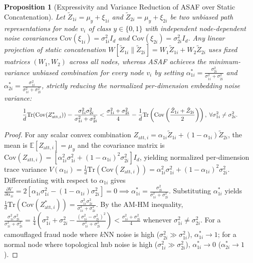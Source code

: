 \documentclass[10pt,a4paper,twocolumn]{article}
\newtheorem{proposition}{Proposition}
\begin{document}
\begin{proposition}[Expressivity and Variance Reduction of ASAF over Static Concatenation]
Let $\tilde{Z}_{1i} = \mu_y + \xi_{1i}$ and $\tilde{Z}_{2i} = \mu_y + \xi_{2i}$ be two unbiased path representations for node $v_i$ of class $y \in \{0, 1\}$ with independent node-dependent noise covariances $\text{Cov}(\xi_{1i}) = \sigma_{1i}^2 I_d$ and $\text{Cov}(\xi_{2i}) = \sigma_{2i}^2 I_d$. Any linear projection of static concatenation $W[\tilde{Z}_{1i} \parallel \tilde{Z}_{2i}] = W_1 \tilde{Z}_{1i} + W_2 \tilde{Z}_{2i}$ uses fixed matrices $(W_1, W_2)$ across all nodes, whereas ASAF achieves the minimum-variance unbiased combination for every node $v_i$ by setting $\alpha_{1i}^* = \frac{\sigma_{2i}^2}{\sigma_{1i}^2 + \sigma_{2i}^2}$ and $\alpha_{2i}^* = \frac{\sigma_{1i}^2}{\sigma_{1i}^2 + \sigma_{2i}^2}$, strictly reducing the normalized per-dimension embedding noise variance:
\begin{equation}
  \resizebox{0.89\linewidth}{!}{$\displaystyle \frac{1}{d}\text{Tr}(\text{Cov}(Z_{\text{att},i}^*)) = \frac{\sigma_{1i}^2 \sigma_{2i}^2}{\sigma_{1i}^2 + \sigma_{2i}^2} < \frac{\sigma_{1i}^2 + \sigma_{2i}^2}{4} = \frac{1}{d}\text{Tr}\left(\text{Cov}\left(\frac{\tilde{Z}_{1i} + \tilde{Z}_{2i}}{2}\right)\right), \; \forall \sigma_{1i}^2 \neq \sigma_{2i}^2.$}
\end{equation}
\end{proposition}

\begin{proof}
For any scalar convex combination $Z_{\text{att},i} = \alpha_{1i} \tilde{Z}_{1i} + (1 - \alpha_{1i}) \tilde{Z}_{2i}$, the mean is $\mathbb{E}[Z_{\text{att},i}] = \mu_y$ and the covariance matrix is $\text{Cov}(Z_{\text{att},i}) = [\alpha_{1i}^2 \sigma_{1i}^2 + (1 - \alpha_{1i})^2 \sigma_{2i}^2] I_d$, yielding normalized per-dimension trace variance $V(\alpha_{1i}) = \frac{1}{d}\text{Tr}(\text{Cov}(Z_{\text{att},i})) = \alpha_{1i}^2 \sigma_{1i}^2 + (1 - \alpha_{1i})^2 \sigma_{2i}^2$. Differentiating with respect to $\alpha_{1i}$ gives $\frac{\partial V}{\partial \alpha_{1i}} = 2[\alpha_{1i} \sigma_{1i}^2 - (1 - \alpha_{1i})\sigma_{2i}^2] = 0 \implies \alpha_{1i}^* = \frac{\sigma_{2i}^2}{\sigma_{1i}^2 + \sigma_{2i}^2}$. Substituting $\alpha_{1i}^*$ yields $\frac{1}{d}\text{Tr}(\text{Cov}(Z_{\text{att},i}^*)) = \frac{\sigma_{1i}^2 \sigma_{2i}^2}{\sigma_{1i}^2 + \sigma_{2i}^2}$. By the AM-HM inequality, $\frac{\sigma_{1i}^2 \sigma_{2i}^2}{\sigma_{1i}^2 + \sigma_{2i}^2} = \frac{1}{4}\left(\sigma_{1i}^2 + \sigma_{2i}^2 - \frac{(\sigma_{1i}^2 - \sigma_{2i}^2)^2}{\sigma_{1i}^2 + \sigma_{2i}^2}\right) < \frac{\sigma_{1i}^2 + \sigma_{2i}^2}{4}$ whenever $\sigma_{1i}^2 \neq \sigma_{2i}^2$. For a camouflaged fraud node where $k$NN noise is high ($\sigma_{2i}^2 \gg \sigma_{1i}^2$), $\alpha_{1i}^* \to 1$; for a normal node where topological hub noise is high ($\sigma_{1i}^2 \gg \sigma_{2i}^2$), $\alpha_{1i}^* \to 0$ ($\alpha_{2i}^* \to 1$).
\end{proof}
\end{document}
